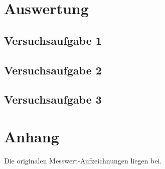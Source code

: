 \documentclass[numbers=noenddot,12pt,a4paper]{scrartcl}
\begin{document}
\section{Auswertung}
\subsection{Versuchsaufgabe 1}

\subsection{Versuchsaufgabe 2}
\subsection{Versuchsaufgabe 3}
\section{Anhang}
Die originalen Messwert-Aufzeichnungen liegen bei.
\end{document}
